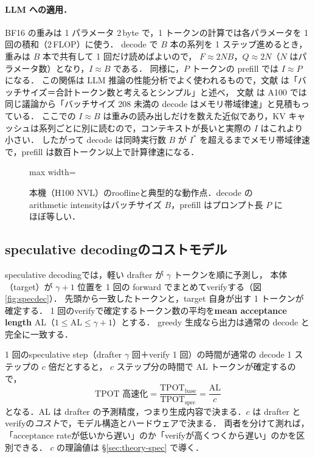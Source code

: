 \documentclass[a4paper,10pt]{ltjsarticle}
\begin{document}
\paragraph{LLM への適用．}
BF16 の重みは 1 パラメータ 2\,byte で，1 トークンの計算では各パラメータを 1 回の積和（2\,FLOP）に使う．
decode で $B$ 本の系列を 1 ステップ進めるとき，重みは $B$ 本で共有して 1 回だけ読めばよいので，
$F \approx 2NB$，$Q \approx 2N$（$N$ はパラメータ数）となり，$I \approx B$ である．
同様に，$P$ トークンの prefill では $I \approx P$ になる．
この関係は LLM 推論の性能分析でよく使われるもので，文献\cite{kotoba} は「バッチサイズ＝合計トークン数と考えるとシンプル」と述べ，
文献\cite{kipply} は A100 では同じ議論から「バッチサイズ 208 未満の decode はメモリ帯域律速」と見積もっている．
ここでの $I \approx B$ は重みの読み出しだけを数えた近似であり，KV キャッシュは系列ごとに別に読むので，コンテキストが長いと実際の $I$ はこれより小さい．
したがって decode は同時実行数 $B$ が $I^\ast$ を超えるまでメモリ帯域律速で，prefill は数百トークン以上で計算律速になる．

\begin{figure}[htbp]\centering
\begin{adjustbox}{max width=\linewidth}\end{adjustbox}
\caption{本機（H100 NVL）のrooflineと典型的な動作点．decode のarithmetic intensityはバッチサイズ $B$，prefill はプロンプト長 $P$ にほぼ等しい．}
\label{fig:roofline-concept}
\end{figure}

\subsection{speculative decodingのコストモデル}
\label{sec:specmodel}
speculative decodingでは，軽い drafter が $\gamma$ トークンを順に予測し，
本体（target）が $\gamma+1$ 位置を 1 回の forward でまとめてverifyする（図\ref{fig:specdec}）．
先頭から一致したトークンと，target 自身が出す 1 トークンが確定する．
1 回のverifyで確定するトークン数の平均を\textbf{mean acceptance length} AL（$1 \le \mathrm{AL} \le \gamma+1$）とする．
greedy 生成なら出力は通常の decode と完全に一致する．

1 回のspeculative step（drafter $\gamma$ 回＋verify 1 回）の時間が通常の decode 1 ステップの $c$ 倍だとすると，
$c$ ステップ分の時間で AL トークンが確定するので，
\begin{equation}
\text{TPOT 高速化} = \frac{\text{TPOT}_\text{base}}{\text{TPOT}_\text{spec}} = \frac{\mathrm{AL}}{c}
\label{eq:spec}
\end{equation}
となる．AL は drafter の予測精度，つまり生成内容で決まる．$c$ は drafter とverifyの\emph{コスト}で，モデル構造とハードウェアで決まる．
両者を分けて測れば，「acceptance rateが低いから遅い」のか「verifyが高くつくから遅い」のかを区別できる．
$c$ の理論値は \S\ref{sec:theory-spec} で導く．
\end{document}

